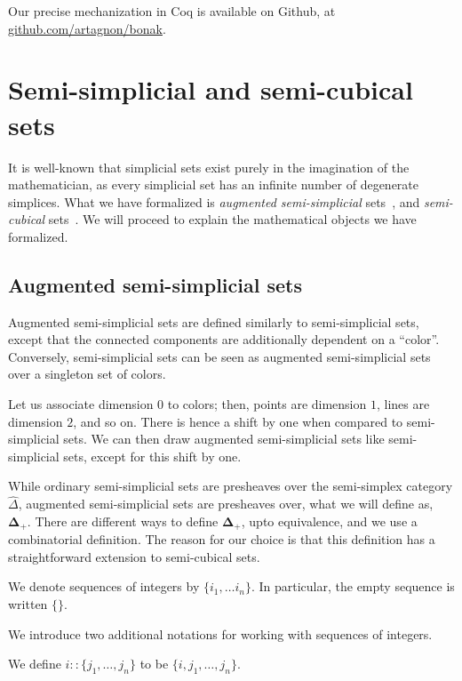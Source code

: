 \documentclass[10pt]{art.cls/art}
\newcommand{\DeltaPlus}{\ensuremath{\boldsymbol{\Delta}_+}}
\begin{document}
Our precise mechanization in Coq is available on Github, at \href{https://github.com/artagnon/bonak}{github.com/artagnon/bonak}.

\section{Semi-simplicial and semi-cubical sets}
It is well-known that simplicial sets exist purely in the imagination of the mathematician, as every simplicial set has an infinite number of degenerate simplices. What we have formalized is \emph{augmented semi-simplicial} sets~\cite{fri08}, and \emph{semi-cubical} sets~\cite{grandis03,buchholtz17}. We will proceed to explain the mathematical objects we have formalized.

\subsection{Augmented semi-simplicial sets}
Augmented semi-simplicial sets are defined similarly to semi-simplicial sets, except that the connected components are additionally dependent on a ``color''. Conversely, semi-simplicial sets can be seen as augmented semi-simplicial sets over a singleton set of colors.

Let us associate dimension $0$ to colors; then, points are dimension $1$, lines are dimension $2$, and so on. There is hence a shift by one when compared to semi-simplicial sets. We can then draw augmented semi-simplicial sets like semi-simplicial sets, except for this shift by one.

While ordinary semi-simplicial sets are presheaves over the semi-simplex category $\hat{\Delta}$, augmented semi-simplicial sets are presheaves over, what we will define as, $\DeltaPlus$. There are different ways to define $\DeltaPlus$, upto equivalence, and we use a combinatorial definition. The reason for our choice is that this definition has a straightforward extension to semi-cubical sets.

\begin{notation}
  We denote sequences of integers by $\{i_1, \ldots i_n\}$. In particular, the empty sequence is written $\{\}$.
\end{notation}

We introduce two additional notations for working with sequences of integers.

\begin{notation}[::]
  We define $i :: \{j_1, \ldots, j_n\}$ to be $\{i, j_1, \ldots, j_n\}$.
\end{notation}
\end{document}

